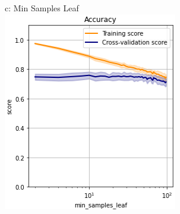 \documentclass{article}
\begin{document}
\begin{figure}
\begin{subfigure}{.24\textwidth}
	\end{subfigure}
	\begin{subfigure}{.24\textwidth}
		c: Min Samples Leaf
		\centering
		\includegraphics[width=\linewidth]{poland_decision_min_samples_leaf.png}
		

\end{subfigure}
\end{figure}
\end{document}
